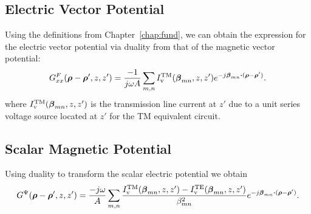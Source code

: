 \subsection{Electric Vector Potential}
Using the definitions from Chapter~\ref{chap:fund}, we can obtain the
expression for the electric vector potential via duality from that of
the magnetic vector potential:
\begin{equation}
  \label{eq:GF}
  G^F_{xx}(\boldsymbol{\rho}-\boldsymbol{\rho}',z,z') = \frac{-1}{j\omega A} \sum_{m,n}
  I_{\text{v}}^{\text{TM}}(\boldsymbol{\beta}_{mn},z,z')   e^{-j\boldsymbol{\beta}_{mn} \boldsymbol{\cdot} (\boldsymbol{\rho}-\boldsymbol{\rho}')}.
\end{equation}
where $I_{\text{v}}^{\text{TM}}(\boldsymbol{\beta}_{mn},z,z')$ is the transmission line current at
$z'$ due to a unit series voltage source located at $z'$ for the TM
equivalent circuit.

\subsection{Scalar Magnetic Potential}
Using duality to transform the scalar electric potential we obtain
\begin{equation}
  \label{eq:GPsi}
  {G}^{\Psi}(\boldsymbol{\rho}-\boldsymbol{\rho}',z,z') = \frac{-j\omega}{A} \sum_{m,n}
  \frac{I_{\text{v}}^{\text{TM}}(\boldsymbol{\beta}_{mn},z,z')-I_{\text{v}}^{\text{TE}}(\boldsymbol{\beta}_{mn},z,z')}{\beta_{mn}^2}
  e^{-j\boldsymbol{\beta}_{mn} \boldsymbol{\cdot} (\boldsymbol{\rho}-\boldsymbol{\rho}')}.
\end{equation}


